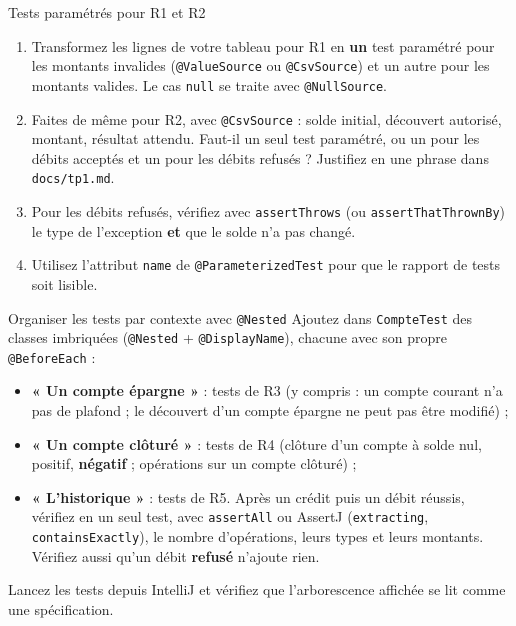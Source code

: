 \documentclass[11pt]{article}
\begin{document}
\begin{exobox}{Tests paramétrés pour R1 et R2}
\begin{enumerate}[leftmargin=1.4em]
  \item Transformez les lignes de votre tableau pour R1 en \textbf{un} test paramétré pour les montants invalides (\texttt{@ValueSource} ou \texttt{@CsvSource}) et un autre pour les montants valides. Le cas \texttt{null} se traite avec \texttt{@NullSource}.
  \item Faites de même pour R2, avec \texttt{@CsvSource} : solde initial, découvert autorisé, montant, résultat attendu. Faut-il un seul test paramétré, ou un pour les débits acceptés et un pour les débits refusés ? Justifiez en une phrase dans \texttt{docs/tp1.md}.
  \item Pour les débits refusés, vérifiez avec \texttt{assertThrows} (ou \texttt{assertThatThrownBy}) le type de l'exception \textbf{et} que le solde n'a pas changé.
  \item Utilisez l'attribut \texttt{name} de \texttt{@ParameterizedTest} pour que le rapport de tests soit lisible.
\end{enumerate}
\end{exobox}

\begin{exobox}{Organiser les tests par contexte avec \texttt{@Nested}}
Ajoutez dans \texttt{CompteTest} des classes imbriquées (\texttt{@Nested} + \texttt{@DisplayName}), chacune avec son propre \texttt{@BeforeEach} :
\begin{itemize}[leftmargin=1.2em]
  \item \textbf{« Un compte épargne »} : tests de R3 (y compris : un compte courant n'a pas de plafond ; le découvert d'un compte épargne ne peut pas être modifié) ;
  \item \textbf{« Un compte clôturé »} : tests de R4 (clôture d'un compte à solde nul, positif, \textbf{négatif} ; opérations sur un compte clôturé) ;
  \item \textbf{« L'historique »} : tests de R5. Après un crédit puis un débit réussis, vérifiez en un seul test, avec \texttt{assertAll} ou AssertJ (\texttt{extracting}, \texttt{containsExactly}), le nombre d'opérations, leurs types et leurs montants. Vérifiez aussi qu'un débit \textbf{refusé} n'ajoute rien.
\end{itemize}
Lancez les tests depuis IntelliJ et vérifiez que l'arborescence affichée se lit comme une spécification.
\end{exobox}
\end{document}
